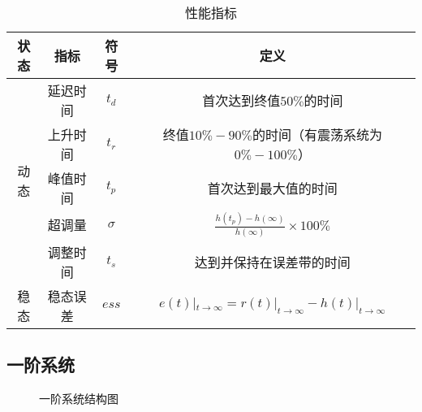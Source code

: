 \documentclass[
12pt, %
a4paper, 
oneside, %
headinclude,footinclude, %
]{scrartcl}
\begin{document}
\begin{table}[H]
\centering
\begin{tabular}{|c|c|c|c|}
\hline
状态 & 指标 & 符号 & 定义 \\
\hline
\multirow{5}{*}{动态} & 延迟时间 & $ t_d $ & 首次达到终值$ 50\% $的时间 \\
\cline{2-4}
& 上升时间 & $ t_r $ & 终值$ 10\% - 90\% $的时间（有震荡系统为$ 0\% - 100\% $） \\
\cline{2-4}
& 峰值时间 & $ t_p $ & 首次达到最大值的时间 \\
\cline{2-4}
& 超调量 & $ \sigma $ & $ \frac{h(t_p) - h(\infty)}{h(\infty)} \times 100\% $ \\
\cline{2-4}
& 调整时间 & $ t_s $ & 达到并保持在误差带的时间 \\
\hline
稳态 & 稳态误差 & $ ess $ & $ e(t)|_{t \to \infty} = r(t)|_{t \to \infty} - h(t)|_{t \to \infty} $ \\
\hline
\end{tabular}
\caption{性能指标}
\end{table}
\subsection[一阶系统]{一阶系统}
\begin{figure}[H]
\centering 
{}
\caption{一阶系统结构图}
\end{figure}
\end{document}

